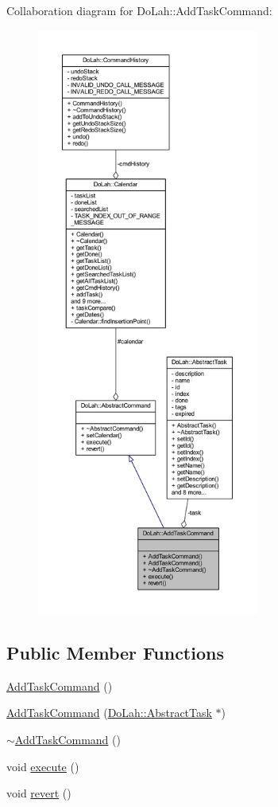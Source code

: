 Collaboration diagram for Do\+Lah\+:\+:Add\+Task\+Command\+:\nopagebreak
\begin{figure}[H]
\begin{center}
\leavevmode
\includegraphics[height=550pt]{class_do_lah_1_1_add_task_command__coll__graph}
\end{center}
\end{figure}
\subsection*{Public Member Functions}
\begin{DoxyCompactItemize}
\item 
\hyperlink{class_do_lah_1_1_add_task_command_a2e4909f7f47879c896ca6a8cc4e0d205}{Add\+Task\+Command} ()
\item 
\hyperlink{class_do_lah_1_1_add_task_command_aff1eceb8a2fa33647cd7f4dcf94dc0a6}{Add\+Task\+Command} (\hyperlink{class_do_lah_1_1_abstract_task}{Do\+Lah\+::\+Abstract\+Task} $\ast$)
\item 
\hyperlink{class_do_lah_1_1_add_task_command_ad851e4dc850a1f15ce2e4491206d3f4b}{$\sim$\+Add\+Task\+Command} ()
\item 
void \hyperlink{class_do_lah_1_1_add_task_command_a27e8abeb8937d70d11d6bfdd276844ca}{execute} ()
\item 
void \hyperlink{class_do_lah_1_1_add_task_command_aa8b0be25711d9875ed4ff4ece28ee75e}{revert} ()
\end{DoxyCompactItemize}
